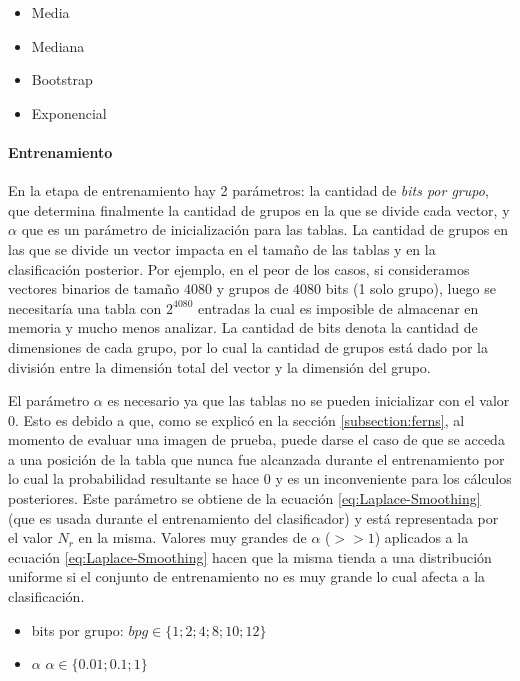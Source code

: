 	\begin{itemize}
		\item Media
		\item Mediana
		\item Bootstrap
		\item Exponencial
	\end{itemize}
	
	
	\paragraph{Entrenamiento}

	En la etapa de entrenamiento hay 2 parámetros: la cantidad de \textit{bits por grupo}, que determina finalmente la cantidad de grupos en la que se divide cada vector, y \textit{$\alpha$} que es un parámetro de inicialización para las tablas. La cantidad de grupos en las que se divide un vector impacta en el tamaño de las tablas y en la clasificación posterior. Por ejemplo, en el peor de los casos, si consideramos vectores binarios de tamaño $4080$ y grupos de $4080$ bits (1 solo grupo), luego se necesitaría una tabla con $2^{4080}$ entradas la cual es imposible de almacenar en memoria y mucho menos analizar. La cantidad de bits denota la cantidad de dimensiones de cada grupo, por lo cual  la cantidad de grupos está dado por la división entre la dimensión total del vector y la dimensión del grupo.

	El parámetro \textit{$\alpha$} es necesario ya que las tablas no se pueden inicializar con el valor $0$. Esto es debido a que, como se explicó en la sección \ref{subsection:ferns}, al momento de evaluar una imagen de prueba, puede darse el caso de que se acceda a una posición de la tabla que nunca fue alcanzada durante el entrenamiento por lo cual la probabilidad resultante se hace 0 y es un inconveniente para los cálculos posteriores. Este parámetro se obtiene de la ecuación \ref{eq:Laplace-Smoothing} (que es usada durante el entrenamiento del clasificador) y está representada por el valor $N_r$ en la misma. Valores muy grandes de $\alpha$ ($>>1$) aplicados a la ecuación \ref{eq:Laplace-Smoothing} hacen que la misma tienda a una distribución uniforme si el conjunto de entrenamiento no es muy grande lo cual afecta a la clasificación.

	\begin{itemize}
		\item bits por grupo: $ bpg \in \{ 1; 2; 4; 8; 10; 12 \}$
		\item $\alpha$ $ \alpha \in \{ 0.01; 0.1; 1 \}$
	\end{itemize}
